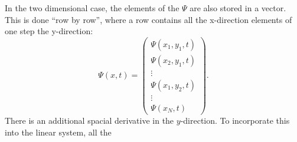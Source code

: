In the two dimensional case, the elements of the $\Psi$ are also stored in a vector. This is done ``row by row'', where a row contains all the x-direction elements of one step the y-direction:
\[
\Psi(x,t) =
 \begin{pmatrix}
    \Psi(x_1,y_1,t)     \\
    \Psi(x_2,y_1,t)     \\
    \vdots              \\
    \Psi(x_1,y_2,t)     \\
    \vdots              \\
    \Psi(x_N,t)
 \end{pmatrix}.
 \] There is an additional spacial derivative in the $y$-direction. To incorporate this into the linear system, all the  